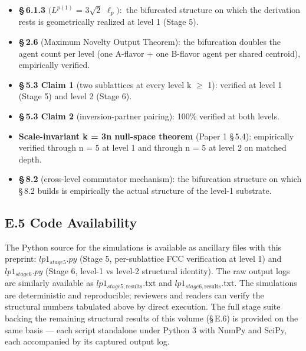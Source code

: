 \documentclass[11pt,oneside]{report}
\theoremstyle{definition}
\theoremstyle{remark}
\begin{document}
\begin{itemize}
\item
  \textbf{\S\,6.1.3} \ensuremath{(L^{p(1)}} = \ensuremath{3\sqrt{2}} \ensuremath{\ell_{p}):} the bifurcated structure on which
  the derivation rests is geometrically realized at level 1 (Stage 5).
\end{itemize}

\begin{itemize}
\item
  \textbf{\S\,2.6} (Maximum Novelty Output Theorem): the bifurcation
  doubles the agent count per level (one A-flavor + one B-flavor agent
  per shared centroid), empirically verified.
\end{itemize}

\begin{itemize}
\item
  \textbf{\S\,5.3 Claim 1} (two sublattices at every level k \ensuremath{\geq} 1): verified
  at level 1 (Stage 5) and level 2 (Stage 6).
\end{itemize}

\begin{itemize}
\item
  \textbf{\S\,5.3 Claim 2} (inversion-partner pairing): 100\% verified at
  both levels.
\end{itemize}

\begin{itemize}
\item
  \textbf{Scale-invariant k = 3n null-space theorem} (Paper 1 \S\,5.4):
  empirically verified through n = 5 at level 1 and through n = 5 at
  level 2 on matched depth.
\end{itemize}

\begin{itemize}
\item
  \textbf{\S\,8.2} (cross-level commutator mechanism): the bifurcation
  structure on which \S\,8.2 builds is empirically the actual structure of
  the level-1 substrate.
\end{itemize}

\subsection*{E.5 Code Availability}

The Python source for the simulations is available as ancillary files
with this preprint: \ensuremath{lp1_{stage5}.py} (Stage 5, per-sublattice FCC
verification at level 1) and \ensuremath{lp1_{stage6}.py} (Stage 6, level-1 vs level-2
structural identity). The raw output logs are similarly available as
\ensuremath{lp1_{stage5,\mathrm{results}}.\text{txt}} and \ensuremath{lp1_{stage6,\mathrm{results}}.\text{txt}.} The simulations
are deterministic and reproducible; reviewers and readers can verify the
structural numbers tabulated above by direct execution. The full stage
suite backing the remaining structural results of this volume (\S\,E.6) is
provided on the same basis --- each script standalone under Python 3 with
NumPy and SciPy, each accompanied by its captured output log.
\end{document}
